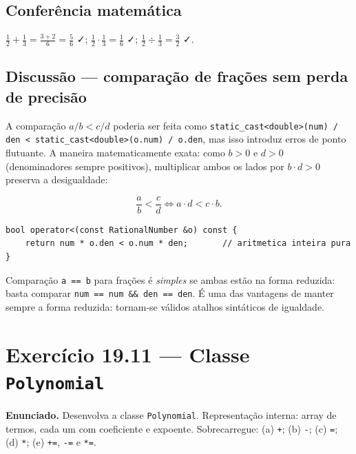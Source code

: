 \documentclass[11pt,a4paper]{article}
\begin{document}
\subsection*{Confer\^encia matem\'atica}

$\tfrac{1}{2} + \tfrac{1}{3} = \tfrac{3+2}{6} = \tfrac{5}{6}$ ✓; $\tfrac{1}{2} \cdot \tfrac{1}{3} = \tfrac{1}{6}$ ✓; $\tfrac{1}{2} \div \tfrac{1}{3} = \tfrac{3}{2}$ ✓.

\subsection*{Discuss\~ao --- compara\c{c}\~ao de fra\c{c}\~oes sem perda de precis\~ao}

A compara\c{c}\~ao $a/b < c/d$ poderia ser feita como \texttt{static\_cast<double>(num) / den < static\_cast<double>(o.num) / o.den}, mas isso introduz erros de ponto flutuante. A maneira matematicamente exata: como $b > 0$ e $d > 0$ (denominadores sempre positivos), multiplicar ambos os lados por $b \cdot d > 0$ preserva a desigualdade:

\[ \frac{a}{b} < \frac{c}{d} \iff a \cdot d < c \cdot b. \]

\begin{lstlisting}[style=cppcode,numbers=none]
bool operator<(const RationalNumber &o) const {
    return num * o.den < o.num * den;       // aritmetica inteira pura
}
\end{lstlisting}

\begin{errocomum}
Compara\c{c}\~ao \texttt{a == b} para fra\c{c}\~oes \'e \emph{simples} se ambas est\~ao na forma reduzida: basta comparar \texttt{num == num \&\& den == den}. \'E uma das vantagens de manter sempre a forma reduzida: tornam-se v\'alidos atalhos sint\'aticos de igualdade.
\end{errocomum}

\newpage
\section{Exerc\'icio 19.11 --- Classe \texttt{Polynomial}}

\begin{enunciado}
\textbf{Enunciado.} Desenvolva a classe \texttt{Polynomial}. Representa\c{c}\~ao interna: array de termos, cada um com coeficiente e expoente. Sobrecarregue: (a) \texttt{+}; (b) \texttt{-}; (c) \texttt{=}; (d) \texttt{*}; (e) \texttt{+=}, \texttt{-=} e \texttt{*=}.
\end{enunciado}
\end{document}
